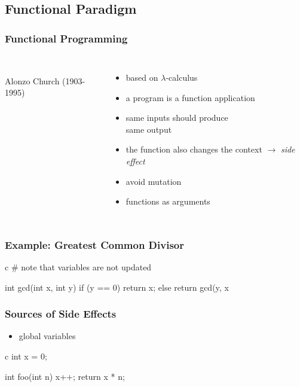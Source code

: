 \documentclass[dvipsnames]{beamer}
\theoremstyle{plain}
\begin{document}
\subsection{Functional Paradigm}

\begin{frame}
  \frametitle{Functional Programming}

  \begin{columns}
    \begin{center}
      \\
      Alonzo Church (1903-1995)
    \end{center}

    \begin{itemize}
      \item based on $\lambda$-calculus
      \item a program is a function application
      \item same inputs should produce\\
        same output

      \pause
      \medskip
      \item the function also changes
        the context $\rightarrow$ \emph{side effect}
      \item \alert{avoid mutation}

      \pause
      \medskip
      \item functions as arguments
    \end{itemize}
  \end{columns}
\end{frame}

\begin{frame}[fragile]
  \frametitle{Example: Greatest Common Divisor}

  \begin{example}
    \begin{pygments}[]{c}
# note that variables are not updated

int gcd(int x, int y)
{
    if (y == 0)
        return x;
    else
        return gcd(y, x %
}
    \end{pygments}
  \end{example}
\end{frame}

\begin{frame}[fragile]
  \frametitle{Sources of Side Effects}

  \begin{itemize}
    \item global variables
  \end{itemize}

  \begin{example}
    \begin{pygments}[]{c}
int x = 0;

int foo(int n)
{
    x++;
    return x * n;
}
    \end{pygments}
  \end{example}
\end{frame}
\end{document}
